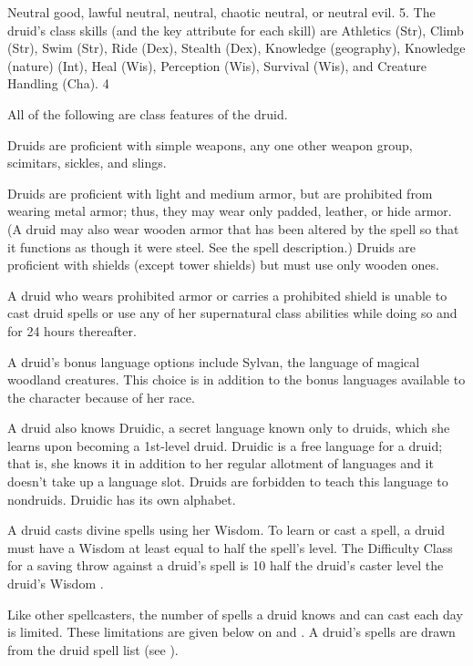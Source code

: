  Neutral good, lawful neutral, neutral, chaotic
neutral, or neutral evil.
 5.
The druid's class skills (and the key attribute for each skill) are Athletics (Str), Climb (Str), Swim (Str), Ride (Dex), Stealth (Dex), Knowledge (geography), Knowledge (nature) (Int), Heal (Wis), Perception (Wis), Survival (Wis), and Creature Handling (Cha).
 4

All of the following are class features of the druid.

 Druids are proficient with simple weapons, any one other weapon group, scimitars, sickles, and slings.
\par Druids are proficient with light and medium armor, but are prohibited from wearing metal armor; thus, they may wear only padded, leather, or hide armor. (A druid may also wear wooden armor that has been altered by the  spell so that it functions as though it were steel. See the  spell description.) Druids are proficient with shields (except tower shields) but must use only wooden ones.
\par A druid who wears prohibited armor or carries a prohibited shield is unable to cast druid spells or use any of her supernatural class abilities while doing so and for 24 hours thereafter.

 A druid's bonus language options include Sylvan, the language of magical woodland creatures. This choice is in addition to the bonus languages available to the character because of her race.

A druid also knows Druidic, a secret language known only to druids, which she learns upon becoming a 1st-level druid. Druidic is a free language for a druid; that is, she knows it in addition to her regular allotment of languages and it doesn't take up a language slot. Druids are forbidden to teach this language to nondruids. Druidic has its own alphabet.

 A druid casts divine spells using her Wisdom. To learn or cast a spell, a druid must have a Wisdom at least equal to half the spell's level. The Difficulty Class for a saving throw against a druid's spell is 10 \add half the druid's caster level \add the druid's Wisdom .

Like other spellcasters, the number of spells a druid knows and can cast each day is limited. These limitations are given below on  and . A druid's spells are drawn from the druid spell list (see ).

